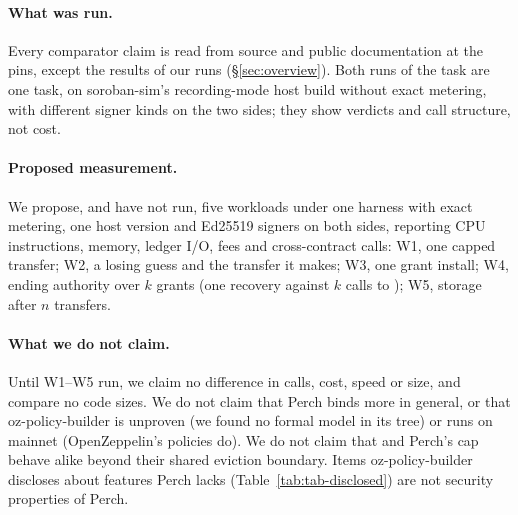 \paragraph{What was run.} Every comparator claim is read from source and public
documentation at the pins, except the results of our runs (\S\ref{sec:overview}).
Both runs of the task are one task, on soroban-sim's recording-mode host build
without exact metering, with different signer kinds on the two sides; they show
verdicts and call structure, not cost.

\paragraph{Proposed measurement.} We propose, and have not run, five workloads
under one harness with exact metering, one host version and Ed25519 signers on
both sides, reporting CPU instructions, memory, ledger I/O, fees and
cross-contract calls: W1, one capped transfer; W2, a losing guess and the
transfer it makes; W3, one grant install; W4, ending authority over $k$ grants
(one recovery against $k$ calls to ); W5, storage
after $n$ transfers.

\paragraph{What we do not claim.} Until W1--W5 run, we claim no difference in
calls, cost, speed or size, and compare no code sizes. We do not claim that Perch
binds more in general, or that oz-policy-builder is unproven (we found no formal
model in its tree) or runs on mainnet (OpenZeppelin's  policies
do). We do not claim that  and Perch's cap behave alike
beyond their shared eviction boundary. Items oz-policy-builder discloses about
features Perch lacks (Table~\ref{tab:tab-disclosed}) are not security properties
of Perch.
